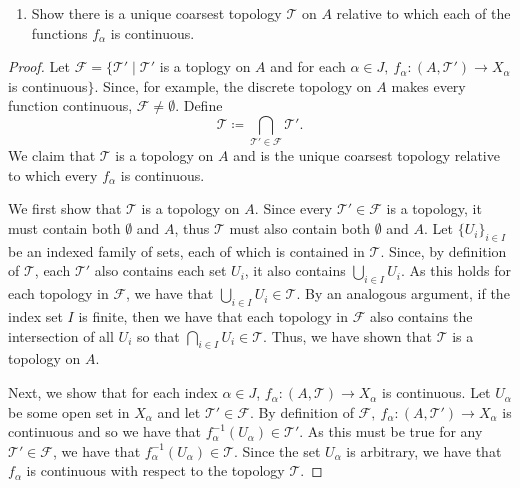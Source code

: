 \documentclass[a4paper,10pt]{article}
\newcommand{\inv}{^{-1}}
\begin{document}
\begin{solution}
    \begin{enumerate}[label={(\alph*)}, align=left, leftmargin=\parindent, listparindent=\parindent, labelwidth=0pt, itemindent=!]
        \item Show there is a unique coarsest topology $\mathcal{T}$ on $A$ relative to which each of the functions $f_\alpha$ is continuous.
    \end{enumerate}
    \begin{proof}
        Let $\mathcal{F} = \{\mathcal{T}' \mid \mathcal{T}'$ is a toplogy on $A$ and for each $\alpha \in J,~ f_\alpha: (A, \mathcal{T}') \rightarrow X_\alpha$ is continuous$\}$.
        Since, for example, the discrete topology on $A$ makes every function continuous, $\mathcal{F} \neq \emptyset$.
        Define
        \begin{equation*}
            \mathcal{T} \coloneq \bigcap_{\mathcal{T}' \in \mathcal{F}} \mathcal{T}'.
        \end{equation*}
        We claim that $\mathcal{T}$ is a topology on $A$ and is the unique coarsest topology relative to which every $f_\alpha$ is continuous.

        We first show that $\mathcal{T}$ is a topology on $A$.
        Since every $\mathcal{T}' \in \mathcal{F}$ is a topology, it must contain both $\emptyset$ and $A$, thus $\mathcal{T}$ must also contain both $\emptyset$ and $A$.
        Let $\{U_i\}_{i \in I}$ be an indexed family of sets, each of which is contained in $\mathcal{T}$.
        Since, by definition of $\mathcal{T}$, each $\mathcal{T}'$ also contains each set $U_i$, it also contains $\bigcup_{i \in I} U_i$.
        As this holds for each topology in $\mathcal{F}$, we have that $\bigcup_{i \in I} U_i \in \mathcal{T}$.
        By an analogous argument, if the index set $I$ is finite, then we have that each topology in $\mathcal{F}$ also contains the intersection of all $U_i$ so that $\bigcap_{i \in I} U_i \in \mathcal{T}$.
        Thus, we have shown that $\mathcal{T}$ is a topology on $A$.

        Next, we show that for each index $\alpha \in J$, $f_\alpha: (A, \mathcal{T}) \rightarrow X_\alpha$ is continuous.
        Let $U_\alpha$ be some open set in $X_\alpha$ and let $\mathcal{T}' \in \mathcal{F}$.
        By definition of $\mathcal{F},~ f_\alpha: (A, \mathcal{T}') \rightarrow X_\alpha$ is continuous and so we have that $f_\alpha\inv(U_\alpha) \in \mathcal{T}'$.
        As this must be true for any $\mathcal{T}' \in \mathcal{F}$, we have that $f_\alpha\inv(U_\alpha) \in \mathcal{T}$.
        Since the set $U_\alpha$ is arbitrary, we have that $f_\alpha$ is continuous with respect to the topology $\mathcal{T}$.


\end{proof}
\end{solution}
\end{document}
